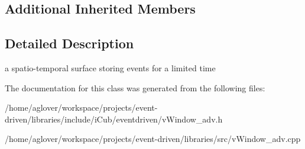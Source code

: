\subsection*{Additional Inherited Members}


\subsection{Detailed Description}
a spatio-\/temporal surface storing events for a limited time 

The documentation for this class was generated from the following files\+:\begin{DoxyCompactItemize}
\item 
/home/aglover/workspace/projects/event-\/driven/libraries/include/i\+Cub/eventdriven/v\+Window\+\_\+adv.\+h\item 
/home/aglover/workspace/projects/event-\/driven/libraries/src/v\+Window\+\_\+adv.\+cpp\end{DoxyCompactItemize}
